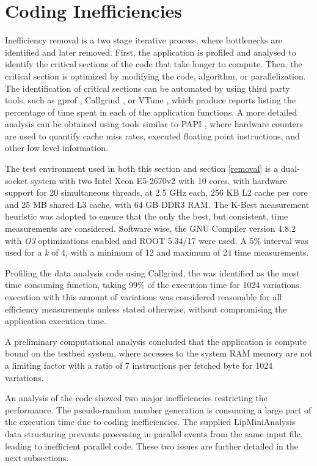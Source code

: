 \section{Coding Inefficiencies}
\label{identification}

Inefficiency removal is a two stage iterative process, where bottlenecks are identified and later removed. First, the application is profiled and analysed to identify the critical sections of the code that take longer to compute. Then, the critical section is optimized by modifying the code, algorithm, or parallelization. The identification of critical sections can be automated by using third party tools, such as gprof \cite{GPROF}, Callgrind \cite{Callgrind}, or VTune \cite{Intel:VTune}, which produce reports listing the percentage of time spent in each of the application functions. A more detailed analysis can be obtained using tools similar to PAPI \cite{PAPI}, where hardware counters are used to quantify cache miss rates, executed floating point instructions, and other low level information.

The test environment used in both this section and section \ref{removal} is a dual-socket system with two Intel Xeon E5-2670v2 \cite{Intel:e5v2} with 10 cores, with hardware support for 20 simultaneous threads, at 2.5 GHz each, 256 KB L2 cache per core and 25 MB shared L3 cache, with 64 GB DDR3 RAM. The K-Best measurement heuristic was adopted to ensure that the only the best, but consistent, time measurements are considered. Software wise, the GNU Compiler version 4.8.2 with \textit{O3} optimizations enabled and ROOT 5.34/17 were used. A 5\% interval was used for a \textit{k} of 4, with a minimum of 12 and maximum of 24 time measurements.

Profiling the data analysis code using Callgrind, the \ttDilepKinFit was identified as the most time consuming function, taking 99\% of the execution time for 1024 variations. \tth execution with this amount of variations was considered reasonable for all efficiency measurements unless stated otherwise, without compromising the application execution time.

A preliminary computational analysis concluded that the application is compute bound on the testbed system, where accesses to the system RAM memory are not a limiting factor with a ratio of 7 instructions per fetched byte for 1024 variations.

An analysis of the code showed two major inefficiencies restricting the performance. The pseudo-random number generation is consuming a large part of the \ttDilepKinFit execution time due to coding inefficiencies. The supplied LipMiniAnalysis data structuring prevents processing in parallel events from the same input file, leading to inefficient parallel code. These two issues are further detailed in the next subsections.

